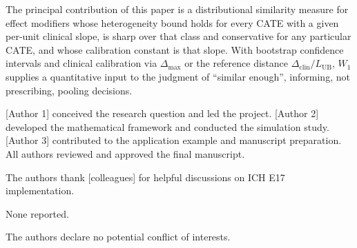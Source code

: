 \documentclass[AMA,Times1COL]{WileyNJDv5}
\begin{document}
The principal contribution of this paper is a distributional similarity measure for effect modifiers whose heterogeneity bound holds for every CATE with a given per-unit clinical slope, is sharp over that class and conservative for any particular CATE, and whose calibration constant is that slope. With bootstrap confidence intervals and clinical calibration via $\Delta_{\max}$ or the reference distance $\Delta_{\text{clin}} / L_{\text{UB}}$, $W_1$ supplies a quantitative input to the judgment of ``similar enough'', informing, not prescribing, pooling decisions.



[Author 1] conceived the research question and led the project. [Author 2] developed the mathematical framework and conducted the simulation study. [Author 3] contributed to the application example and manuscript preparation. All authors reviewed and approved the final manuscript.


The authors thank [colleagues] for helpful discussions on ICH E17 implementation.


None reported.


The authors declare no potential conflict of interests.

\end{document}
